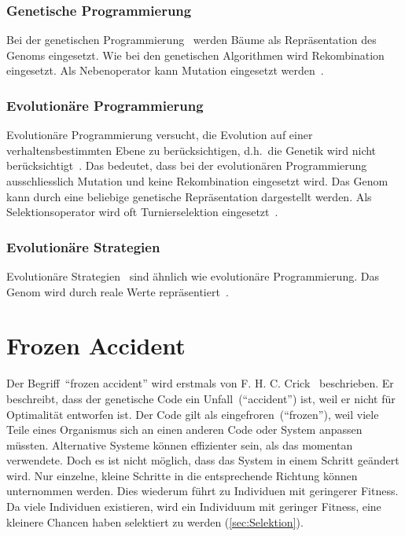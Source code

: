       \subsubsection{Genetische Programmierung\label{item:genProg}}

        Bei der genetischen Programmierung~\cite{book:genProg} werden Bäume als Repräsentation des Genoms eingesetzt.
        Wie bei den genetischen Algorithmen wird Rekombination eingesetzt.
        Als Nebenoperator kann Mutation eingesetzt werden~\cite[S.147]{book:evAlgo}.

      \subsubsection{Evolutionäre Programmierung\label{item:evProg}}

        Evolutionäre Programmierung versucht, die Evolution auf einer verhaltensbestimmten Ebene zu berücksichtigen,
        d.h.\ die Genetik wird nicht berücksichtigt~\cite[S.140]{book:evAlgo}.
        Das bedeutet, dass bei der evolutionären Programmierung~\cite{book:artIntSimEv}
        ausschliesslich Mutation und keine Rekombination eingesetzt wird.
        Das Genom kann durch eine beliebige genetische Repräsentation dargestellt werden.
        Als Selektionsoperator wird oft Turnierselektion eingesetzt~\cite[S.33]{book:bioInspired}.

      \subsubsection{Evolutionäre Strategien\label{item:evStrat}}

        Evolutionäre Strategien~\cite{book:evStrat} sind ähnlich wie evolutionäre Programmierung.
        Das Genom wird durch reale Werte repräsentiert~\cite[S.134]{book:evAlgo}.

  \section{Frozen Accident}

    Der Begriff~``frozen accident'' wird erstmals von F. H. C. Crick~\cite{Crick1968} beschrieben.
    Er beschreibt, dass der genetische Code ein Unfall~(``accident'') ist,
    weil er nicht für Optimalität entworfen ist.
    Der Code gilt als eingefroren~(``frozen''),
    weil viele Teile eines Organismus sich an einen anderen Code oder System anpassen müssten.
    Alternative Systeme können effizienter sein, als das momentan verwendete.
    Doch es ist nicht möglich, dass das System in einem Schritt geändert wird.
    Nur einzelne, kleine Schritte in die entsprechende Richtung können unternommen werden.
    Dies wiederum führt zu Individuen mit geringerer Fitness.
    Da viele Individuen existieren, wird ein Individuum mit geringer Fitness, eine kleinere Chancen haben selektiert zu werden (\vref{sec:Selektion}).
